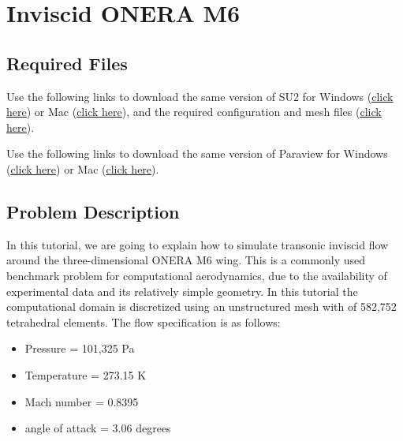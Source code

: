 \chapter{Inviscid ONERA M6}
\label{ch:Inviscid ONERA M6}
\section{Required Files}
\begin{su2note}
	Use the following links to download the same version of SU2 for Windows (\href{https://users.encs.concordia.ca/~bvermeir/book/executables/windows/SU2_Windows.zip}{\underline{click here}}) or Mac (\href{https://users.encs.concordia.ca/~bvermeir/book/executables/osx/SU2_Mac.zip}{\underline{click here}}), and the required configuration and mesh files (\href{https://gitlab.com/bvermeir/book-cfd/blob/master/tutorial/tut3_invisicd_oneram6/oneram6_inviscid.zip}{\underline{click here}}).
\end{su2note}
\begin{paraviewnote}
	Use the following links to download the same version of Paraview for Windows (\href{https://users.encs.concordia.ca/~bvermeir/book/executables/windows/ParaView-5.4.0-Qt5-OpenGL2-Windows-64bit.exe}{\underline{click here}}) or Mac (\href{https://users.encs.concordia.ca/~bvermeir/book/executables/osx/ParaView-5.4.0-Qt5-OpenGL2-MPI-OSX10.8-64bit.dmg}{\underline{click here}}).
\end{paraviewnote}

\section{Problem Description}
In this tutorial, we are going to explain how to simulate transonic inviscid flow around the three-dimensional ONERA M6 wing. This is a commonly used benchmark problem for computational aerodynamics, due to the availability of experimental data and its relatively simple geometry. In this tutorial the computational domain is discretized using an unstructured mesh with of 582,752 tetrahedral elements. The flow specification is as follows:
\begin{itemize}
    \item Pressure = 101,325 Pa
    \item Temperature = 273.15 K
    \item Mach number = 0.8395
    \item angle of attack = 3.06 degrees
\end{itemize}

